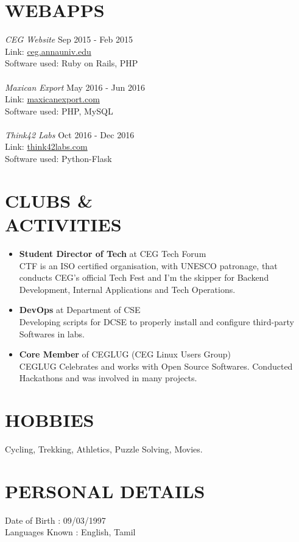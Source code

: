 \documentclass[margin, 10pt]{res} %
\begin{document}
\begin{resume}
\section{WEBAPPS}
{\sl CEG Website} \hfill Sep 2015 - Feb 2015 \\
Link: \href{http://ceg.annauniv.edu}{ceg.annauniv.edu} \\
Software used: Ruby on Rails, PHP \\
\\
{\sl Maxican Export} \hfill May 2016 - Jun 2016 \\
Link: \href{http://maxicanexport.com}{maxicanexport.com} \\
Software used: PHP, MySQL \\
\\
{\sl Think42 Labs} \hfill Oct 2016 - Dec 2016 \\
Link: \href{http://think42labs.com}{think42labs.com} \\
Software used: Python-Flask
\section{CLUBS \& \\ ACTIVITIES}
\begin{itemize}
\item \textbf{Student Director of Tech} at CEG Tech Forum \\
CTF is an ISO certified organisation, with UNESCO patronage, that conducts CEG's official Tech Fest and I'm the skipper for Backend Development, Internal Applications and Tech Operations.
\item \textbf{DevOps} at Department of CSE \\
Developing scripts for DCSE to properly install and configure third-party Softwares in labs.
\item \textbf{Core Member} of CEGLUG (CEG Linux Users Group) \\
CEGLUG Celebrates and works with Open Source Softwares. Conducted Hackathons and was involved in many projects.
\end{itemize}
\section{HOBBIES}
Cycling, Trekking, Athletics, Puzzle Solving, Movies.
\section{PERSONAL DETAILS}
Date of Birth \hspace{18pt} : 09/03/1997 \\
Languages Known \hspace{1pt}: English, Tamil
\end{resume}
\end{document}
